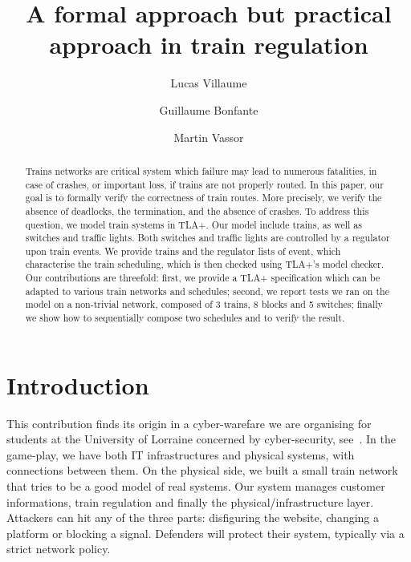 \documentclass[runningheads]{llncs}
\begin{document}
%
\title{A formal approach but practical approach in train regulation}
%
%
\author{Lucas Villaume \and Guillaume Bonfante \and Martin Vassor  }
%
%
%
\maketitle
%
\begin{abstract}
	Trains networks are critical system which failure may lead to numerous fatalities, in case of crashes, or important loss, if trains are not properly routed. 
	In this paper, our goal is to formally verify the correctness of train routes. More precisely, we verify the absence of deadlocks, the termination, and the absence of crashes.
	To address this question, we model train systems in TLA+. Our model include trains, as well as switches and traffic lights. Both switches and traffic lights are controlled by a regulator upon train events. We provide trains and the regulator lists of event, which characterise the train scheduling, which is then checked using TLA+'s model checker.
	Our contributions are threefold: first, we provide a TLA+ specification which can be adapted to various train networks and schedules; second, we report tests we ran on the model on a non-trivial network, composed of 3 trains, 8 blocks and 5 switches; finally we show how to sequentially compose two schedules and to verify the result.

\end{abstract}


\section{Introduction}
\label{sec:introduction}

This contribution finds its origin in a cyber-warefare we are organising for students at the University of Lorraine concerned by cyber-security, see~\cite{CHE}. In the game-play, we have both IT infrastructures and physical systems, with connections between them. On the physical side, we built a small train network that tries to be a good model of real systems.  Our system manages customer informations, train regulation and finally the physical/infrastructure layer. Attackers can hit any of the three parts: disfiguring the website, changing a platform or blocking a signal. Defenders will protect their system, typically via a strict network policy.
\end{document}
